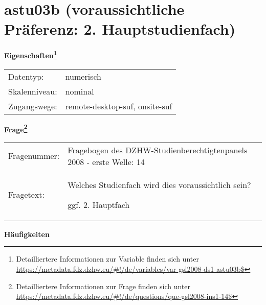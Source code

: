 
    \setcounter{footnote}{0}

    \vspace*{-1.8cm}
	\section{astu03b (voraussichtliche Präferenz: 2. Hauptstudienfach)}
	\label{section:astu03b}



    \vspace*{0.5cm}
    \noindent\textbf{Eigenschaften\footnote{Detailliertere Informationen zur Variable finden sich unter
		\url{https://metadata.fdz.dzhw.eu/\#!/de/variables/var-gsl2008-ds1-astu03b$}}}\\
	\begin{tabularx}{\hsize}{@{}lX}
	Datentyp: & numerisch \\
	Skalenniveau: & nominal \\
	Zugangswege: &
	  remote-desktop-suf, 
	  onsite-suf
 \\
    \end{tabularx}



				\vspace*{0.5cm}
                \noindent\textbf{Frage\footnote{Detailliertere Informationen zur Frage finden sich unter
		              \url{https://metadata.fdz.dzhw.eu/\#!/de/questions/que-gsl2008-ins1-14$}}}\\
				\begin{tabularx}{\hsize}{@{}lX}
					Fragenummer: &
					  Fragebogen des DZHW-Studienberechtigtenpanels 2008 - erste Welle:
					  14
 \\
					Fragetext: & Welches Studienfach wird dies voraussichtlich sein?\par  ggf. 2. Hauptfach \\
				\end{tabularx}





        		\vspace*{0.5cm}
                \noindent\textbf{Häufigkeiten}

